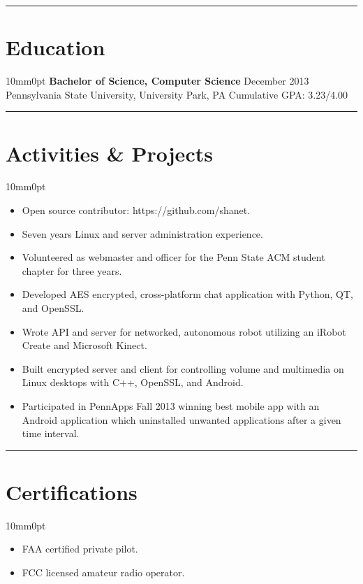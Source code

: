 \documentclass[letterpaper]{article}
\newcommand{\sectionrule}[1] {
  \noindent\rule{\textwidth}{.1mm}
  \vspace{-11mm}
  \section{#1}
}
\newenvironment{indentsection}
  {\begin{adjustwidth}{10mm}{0pt}}
  {\end{adjustwidth}}
\begin{document}
  \sectionrule{Education}

  \begin{indentsection}
    \textbf{Bachelor of Science, Computer Science} \hfill December 2013\\
    Pennsylvania State University, University Park, PA \hfill Cumulative GPA: 3.23/4.00
  \end{indentsection}

  \sectionrule{Activities \& Projects}

  \begin{indentsection}
    \begin{itemize}
      \item Open source contributor: https://github.com/shanet.
      \item Seven years Linux and server administration experience.
      \item Volunteered as webmaster and officer for the Penn State ACM student chapter for three years.
      \item Developed AES encrypted, cross-platform chat application with Python, QT, and OpenSSL.
      \item Wrote API and server for networked, autonomous robot utilizing an iRobot Create and Microsoft Kinect.
      \item Built encrypted server and client for controlling volume and multimedia on Linux desktops with C++, OpenSSL, and Android.
      \item Participated in PennApps Fall 2013 winning best mobile app with an Android application which uninstalled unwanted applications after a given time interval.
    \end{itemize}
  \end{indentsection}

  \sectionrule{Certifications}

  \begin{indentsection}
    \begin{itemize}
      \item FAA certified private pilot.
      \item FCC licensed amateur radio operator.
    \end{itemize}
  \end{indentsection}
\end{document}
